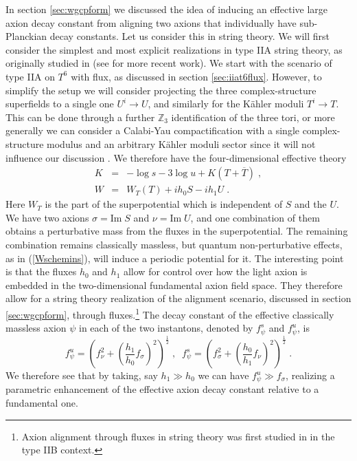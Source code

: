 \documentclass[11pt,a4paper]{article}
\numberwithin{equation}{section}
\numberwithin{table}{section}\setlength{\multlinegap}{25pt}
\newcommand{\bea}{\begin{eqnarray}}  \newcommand{\eea}{\end{eqnarray}}
\newcommand{\nn}{\nonumber}
\newcommand{\be}{\begin{equation}}
\newcommand{\ee}{\end{equation}}
\begin{document}
In section \ref{sec:wgcpform} we discussed the idea of inducing an effective large axion decay constant from aligning two axions that individually have sub-Planckian decay constants. Let us consider this in string theory. We will first consider the simplest and most explicit realizations in type IIA string theory, as originally studied in \cite{Palti:2015xra,Baume:2016psm} (see \cite{Hebecker:2018fln,Goswami:2018pvk} for more recent work). We start with the scenario of type IIA on $T^6$ with flux, as discussed in section \ref{sec:iiat6flux}. However, to simplify the setup we will consider projecting the three complex-structure superfields to a single one $U^i \rightarrow U$, and similarly for the K{\"a}hler moduli $T^i \rightarrow T$. This can be done through a further $\mathbb{Z}_3$ identification of the three tori, or more generally we can consider a Calabi-Yau compactification with a single complex-structure modulus and an arbitrary K{\"a}hler moduli sector since it will not influence our discussion \cite{Palti:2015xra}. We therefore have the four-dimensional effective theory
\bea
K &=& - \log s - 3 \log u + K\left(T + \overline{T}\right) \;,  \\  \nn
W &=&  W_T\left(T\right) + i h_0 S - i h_1 U \;.
\label{simaxaliiaa}
\eea
Here $W_T$ is the part of the superpotential which is independent of $S$ and the $U$.
We have two axions $\sigma=\mathrm{Im\;} S$ and $\nu=\mathrm{Im\;} U$, and one combination of them obtains a perturbative mass from the fluxes in the superpotential. The remaining combination remains classically massless, but quantum non-perturbative effects, as in (\ref{Wschemins}), will induce a periodic potential for it. The interesting point is that the fluxes $h_0$ and $h_1$ allow for control over how the light axion is embedded in the two-dimensional fundamental axion field space. They therefore allow for a string theory realization of the alignment scenario, discussed in section \ref{sec:wgcpform}, through fluxes.\footnote{Axion alignment through fluxes in string theory was first studied in \cite{Hebecker:2015rya} in the type IIB context.} The decay constant of the effective classically massless axion $\psi$ in each of the two instantons, denoted by $f_{\psi}^s$ and $f_{\psi}^u$, is \cite{Palti:2015xra}
\be
f_{\psi}^u = \left(f^2_{\nu} + \left(\frac{h_1}{h_0} f_{\sigma}\right)^2 \right)^{\frac12} \;,\;\; f_{\psi}^s =  \left(f^2_{\sigma} + \left(\frac{h_0}{h_1} f_{\nu}\right)^2 \right)^{\frac12}  \;.
\label{fsfuiia}
\ee
We therefore see that by taking, say $h_1 \gg h_0$ we can have $f_{\psi}^u \gg f_{\sigma}$, realizing a parametric enhancement of the effective axion decay constant relative to a fundamental one. 
\end{document}
